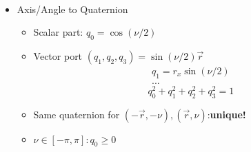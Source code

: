 \documentclass{article}
\begin{document}
\begin{itemize}
\begin{gather*}
    \end{gather*}
    \item Axis/Angle to Quaternion
    \begin{itemize}
        \item Scalar part: $q_0=\cos{(\nu/2)}$
        \item Vector port $(q_1,q_2,q_3) = \sin{(\nu/2)}\vec{r}{} $\\
        \begin{gather*}
           q_1 = r_x\sin{(\nu/2)} \\
           ...
        \end{gather*}
        $$ q^2_0 + q^2_1 + q^2_2 + q^2_3 = 1 $$

        \item Same quaternion for $(-\vec{r}{}, -\nu), (\vec{r}{}, \nu)$:\textbf{unique!}
        \item $\nu \in [-\pi, \pi]:q_0\geq0$
    \end{itemize}
\end{itemize}
\end{document}
